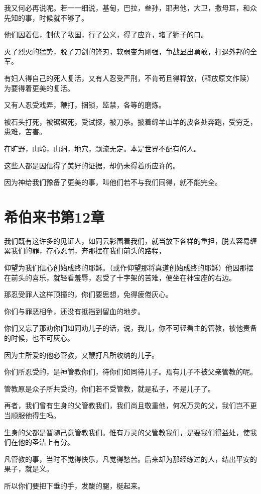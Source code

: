 \documentclass[12pt,oneside]{book}
\begin{document}
我又何必再说呢。若一一细说，基甸，巴拉，叁孙，耶弗他，大卫，撒母耳，和众先知的事，时候就不够了。

他们因着信，制伏了敌国，行了公义，得了应许，堵了狮子的口。

灭了烈火的猛势，脱了刀剑的锋刃，软弱变为刚强，争战显出勇敢，打退外邦的全军。

有妇人得自己的死人复活，又有人忍受严刑，不肯苟且得释放，（释放原文作赎）为要得着更美的复活。

又有人忍受戏弄，鞭打，捆锁，监禁，各等的磨炼。

被石头打死，被锯锯死，受试探，被刀杀。披着绵羊山羊的皮各处奔跑，受穷乏，患难，苦害。

在旷野，山岭，山洞，地穴，飘流无定。本是世界不配有的人。

这些人都是因信得了美好的证据，却仍未得着所应许的。

因为神给我们豫备了更美的事，叫他们若不与我们同得，就不能完全。

\chapter{希伯来书第12章}
我们既有这许多的见证人，如同云彩围着我们，就当放下各样的重担，脱去容易缠累我们的罪，存心忍耐，奔那摆在我们前头的路程，

仰望为我们信心创始成终的耶稣。（或作仰望那将真道创始成终的耶稣）他因那摆在前头的喜乐，就轻看羞辱，忍受了十字架的苦难，便坐在神宝座的右边。

那忍受罪人这样顶撞的，你们要思想，免得疲倦灰心。

你们与罪恶相争，还没有抵挡到留血的地步。

你们又忘了那劝你们如同劝儿子的话，说，我儿，你不可轻看主的管教，被他责备的时候，也不可灰心。

因为主所爱的他必管教，又鞭打凡所收纳的儿子。

你们所忍受的，是神管教你们，待你们如同待儿子。焉有儿子不被父亲管教的呢。

管教原是众子所共受的，你们若不受管教，就是私子，不是儿子了。

再者，我们曾有生身的父管教我们，我们尚且敬重他，何况万灵的父，我们岂不更当顺服他得生吗。

生身的父都是暂随己意管教我们。惟有万灵的父管教我们，是要我们得益处，使我们在他的圣洁上有分。

凡管教的事，当时不觉得快乐，凡觉得愁苦。后来却为那经练过的人，结出平安的果子，就是义。

所以你们要把下垂的手，发酸的腿，梃起来。
\end{document}
